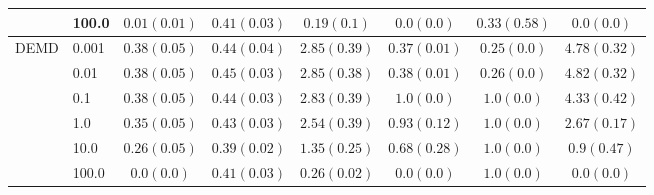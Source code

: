\begin{table*}
\begin{tabular*}{\linewidth}{ll| *{3}{c}|*{3}{c}}
	 & 100.0 & $0.01\scriptscriptstyle(0.01)$ & $0.41\scriptscriptstyle(0.03)$ & $0.19\scriptscriptstyle(0.1)$ & $0.0\scriptscriptstyle(0.0)$ & $0.33\scriptscriptstyle(0.58)$ & $0.0\scriptscriptstyle(0.0)$ \\
\midrule
DEMD & 0.001 & $0.38\scriptscriptstyle(0.05)$ & $0.44\scriptscriptstyle(0.04)$ & $2.85\scriptscriptstyle(0.39)$ & $0.37\scriptscriptstyle(0.01)$ & $0.25\scriptscriptstyle(0.0)$ & $4.78\scriptscriptstyle(0.32)$ \\
	 & 0.01 & $0.38\scriptscriptstyle(0.05)$ & $0.45\scriptscriptstyle(0.03)$ & $2.85\scriptscriptstyle(0.38)$ & $0.38\scriptscriptstyle(0.01)$ & $0.26\scriptscriptstyle(0.0)$ & $4.82\scriptscriptstyle(0.32)$ \\
	 & 0.1 & $0.38\scriptscriptstyle(0.05)$ & $0.44\scriptscriptstyle(0.03)$ & $2.83\scriptscriptstyle(0.39)$ & $1.0\scriptscriptstyle(0.0)$ & $1.0\scriptscriptstyle(0.0)$ & $4.33\scriptscriptstyle(0.42)$ \\
	 & 1.0 & $0.35\scriptscriptstyle(0.05)$ & $0.43\scriptscriptstyle(0.03)$ & $2.54\scriptscriptstyle(0.39)$ & $0.93\scriptscriptstyle(0.12)$ & $1.0\scriptscriptstyle(0.0)$ & $2.67\scriptscriptstyle(0.17)$ \\
	 & 10.0 & $0.26\scriptscriptstyle(0.05)$ & $0.39\scriptscriptstyle(0.02)$ & $1.35\scriptscriptstyle(0.25)$ & $0.68\scriptscriptstyle(0.28)$ & $1.0\scriptscriptstyle(0.0)$ & $0.9\scriptscriptstyle(0.47)$ \\
	 & 100.0 & $0.0\scriptscriptstyle(0.0)$ & $0.41\scriptscriptstyle(0.03)$ & $0.26\scriptscriptstyle(0.02)$ & $0.0\scriptscriptstyle(0.0)$ & $1.0\scriptscriptstyle(0.0)$ & $0.0\scriptscriptstyle(0.0)$ \\
\midrule

	\end{tabular*}
	\label{tab:fair_reg_results_2}
\end{table*} 
